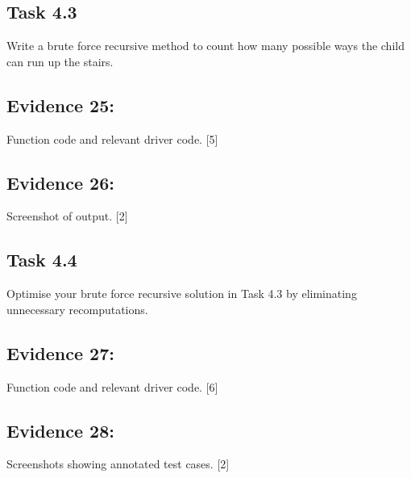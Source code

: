 \subsection*{Task 4.3 }

Write a brute force recursive method to count how many possible ways
the child can run up the stairs. 

\subsection*{Evidence 25: }

Function code and relevant driver code.\hfill{} {[}5{]}

\subsection*{Evidence 26: }

Screenshot of output.\hfill{} {[}2{]}

\subsection*{Task 4.4 }

Optimise your brute force recursive solution in Task 4.3 by eliminating
unnecessary recomputations.

\subsection*{Evidence 27: }

Function code and relevant driver code.\hfill{} {[}6{]}

\subsection*{Evidence 28:}

Screenshots showing annotated test cases. \hfill{} {[}2{]}